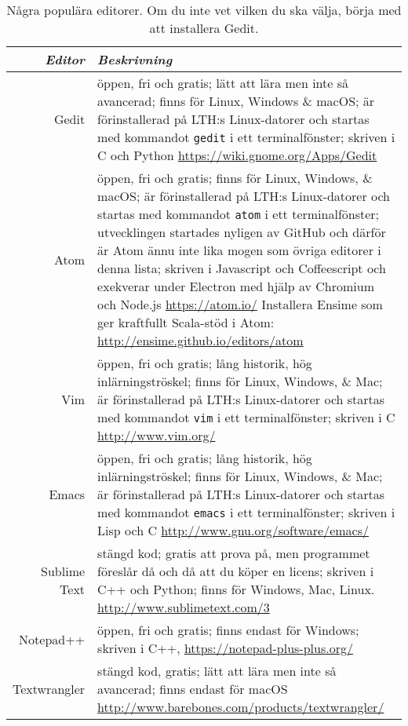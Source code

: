 \begin{table}[T]

\renewcommand{\arraystretch}{1.25}

\begin{tabular}{@{}r | p{}}
\textit{Editor} & \textit{Beskrivning} \\ \hline

Gedit & öppen, fri och gratis; lätt att lära men inte så avancerad; finns för Linux, Windows \& macOS; är förinstallerad på LTH:s Linux-datorer och startas med kommandot \verb+gedit+ i ett terminalfönster; skriven i C och Python \newline  
 \url{https://wiki.gnome.org/Apps/Gedit} \\

Atom & öppen, fri och gratis; finns för Linux, Windows, \& macOS; är förinstallerad på LTH:s Linux-datorer och startas med kommandot \verb+atom+ i ett terminalfönster; utvecklingen startades nyligen av GitHub och därför är Atom ännu inte lika mogen som övriga editorer i denna lista; skriven i Javascript och Coffeescript och exekverar under  Electron med hjälp av Chromium och Node.js \newline \url{https://atom.io/} \newline 
Installera Ensime som ger kraftfullt Scala-stöd i Atom: \newline \url{http://ensime.github.io/editors/atom}\\


Vim & öppen, fri och gratis; lång historik, hög inlärningströskel; finns för Linux, Windows, \& Mac; är förinstallerad på LTH:s Linux-datorer och startas med kommandot \verb+vim+ i ett terminalfönster; skriven i C \newline \url{http://www.vim.org/} \\

Emacs & öppen, fri och gratis; lång historik, hög inlärningströskel; finns för Linux, Windows, \& Mac; är förinstallerad på LTH:s Linux-datorer och startas med kommandot \verb+emacs+ i ett terminalfönster; skriven i Lisp och C \newline \url{http://www.gnu.org/software/emacs/} \\

Sublime Text& stängd kod; gratis att prova på, men programmet föreslår då och då att du köper en licens;  skriven i C++ och Python; finns för Windows, Mac, Linux. \newline
 \url{http://www.sublimetext.com/3} \\


Notepad++ & öppen, fri och gratis; finns endast för Windows; skriven i C++, \url{https://notepad-plus-plus.org/} \\


Textwrangler & stängd kod, gratis; lätt att lära men inte så avancerad; finns endast för macOS  
\newline \url{http://www.barebones.com/products/textwrangler/} \\

\end{tabular}
    \caption{Några populära editorer. Om du inte vet vilken du ska välja, börja med att installera Gedit.}
    \label{edit:popular-editors}
\end{table}